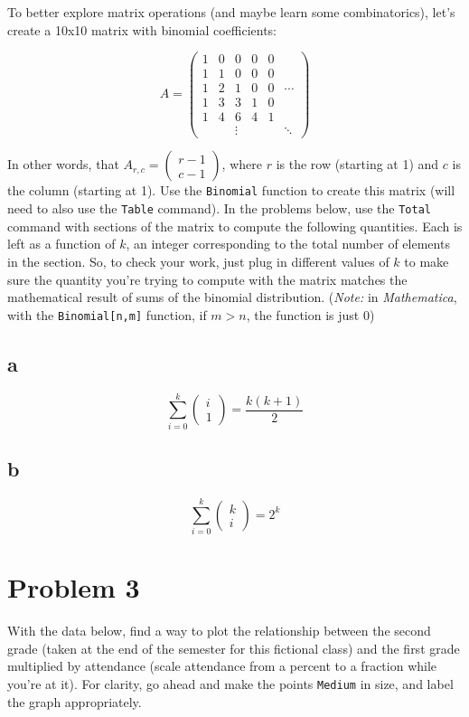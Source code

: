 \documentclass{article}
\begin{document}
To better explore matrix operations (and maybe learn some combinatorics), let\rq{}s create a 10x10 matrix with binomial coefficients:

$$A=\begin{pmatrix}
1 & 0 & 0 & 0 & 0 & \\
1 & 1 & 0 & 0 & 0 & \\
1 & 2 & 1 & 0 & 0 & \cdots\\
1 & 3 & 3 & 1 & 0 & \\
1 & 4 & 6 & 4 & 1 & \\
   &     &  \vdots & &    & \ddots
\end{pmatrix}$$

In other words, that $A_{r,c}=\begin{pmatrix}r-1 \\ c-1\end{pmatrix}$, where $r$ is the row (starting at 1) and $c$ is the column (starting at 1). Use the \texttt{Binomial}
function to create this matrix (will need to also use the \texttt{Table} command). In the problems below, use the \texttt{Total} command with sections of the matrix to compute the
following quantities. Each is left as a function of $k$, an integer corresponding to the total number of elements in the section. So, to check your work, just plug in different
values of $k$ to make sure the quantity you\rq{}re trying to compute with the matrix matches the mathematical result of sums of the binomial distribution.
(\textit{Note:} in \textit{Mathematica}, with the \texttt{Binomial[n,m]} function, if $m>n$, the function is just $0$)

\subsection{a}
$$\sum_{i=0}^k \begin{pmatrix}i\\1\end{pmatrix}=\frac{k(k+1)}{2}$$

\subsection{b}
$$\sum_{i=0}^k \begin{pmatrix}k \\ i\end{pmatrix}=2^k$$

\section{Problem 3}
With the data below, find a way to plot the relationship between the second grade (taken at the end of the semester for this fictional class) and the first grade multiplied by attendance
(scale attendance from a percent to a fraction while you're at it). For clarity, go ahead and make the points \texttt{Medium} in size, and label the graph appropriately.
\end{document}
